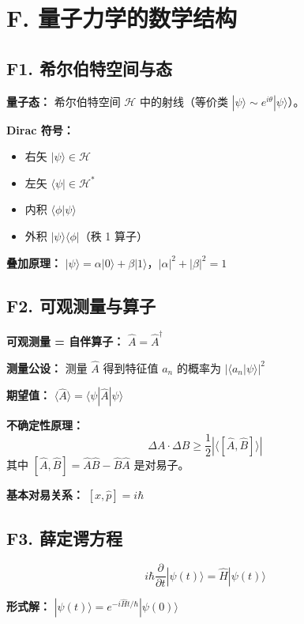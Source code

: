 \section{F. 量子力学的数学结构}

\subsection{F1. 希尔伯特空间与态}

\textbf{量子态：} 希尔伯特空间 $\mathcal{H}$ 中的射线（等价类 $|\psi\rangle \sim e^{i\theta}|\psi\rangle$）。

\textbf{Dirac 符号：}
\begin{itemize}
  \item 右矢 $|\psi\rangle \in \mathcal{H}$
  \item 左矢 $\langle\psi| \in \mathcal{H}^*$
  \item 内积 $\langle\phi|\psi\rangle$
  \item 外积 $|\psi\rangle\langle\phi|$（秩 1 算子）
\end{itemize}

\textbf{叠加原理：} $|\psi\rangle = \alpha|0\rangle + \beta|1\rangle$，$|\alpha|^2 + |\beta|^2 = 1$

\subsection{F2. 可观测量与算子}

\textbf{可观测量 = 自伴算子：} $\hat{A} = \hat{A}^\dagger$

\textbf{测量公设：} 测量 $\hat{A}$ 得到特征值 $a_n$ 的概率为 $|\langle a_n|\psi\rangle|^2$

\textbf{期望值：} $\langle \hat{A} \rangle = \langle\psi|\hat{A}|\psi\rangle$

\textbf{不确定性原理：}
\[
\Delta A \cdot \Delta B \geq \frac{1}{2}|\langle[\hat{A}, \hat{B}]\rangle|
\]
其中 $[\hat{A}, \hat{B}] = \hat{A}\hat{B} - \hat{B}\hat{A}$ 是对易子。

\textbf{基本对易关系：} $[\hat{x}, \hat{p}] = i\hbar$

\subsection{F3. 薛定谔方程}

\[
i\hbar\frac{\partial}{\partial t}|\psi(t)\rangle = \hat{H}|\psi(t)\rangle
\]

\textbf{形式解：} $|\psi(t)\rangle = e^{-i\hat{H}t/\hbar}|\psi(0)\rangle$

